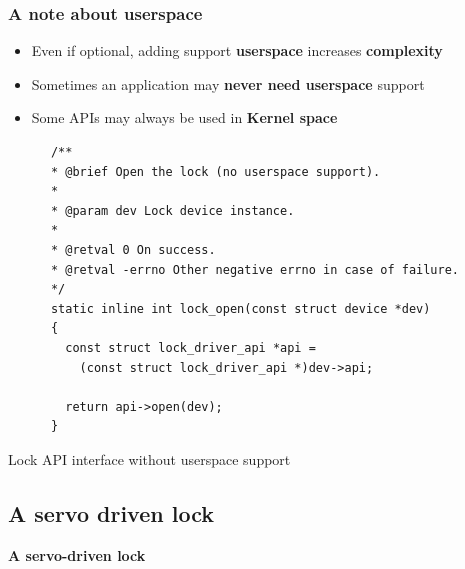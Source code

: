 \documentclass[handout]{beamer}
\begin{document}
\begin{frame}[fragile]
  \frametitle{A note about userspace}

  \begin{itemize}
    \item Even if optional, adding support \textbf{userspace} increases
          \textbf{complexity}
    \item Sometimes an application may \textbf{never need userspace} support
    \item Some APIs may always be used in \textbf{Kernel space}
  \end{itemize}

  \begin{listing}[H]
    \begin{verbatim}
      /**
      * @brief Open the lock (no userspace support).
      *
      * @param dev Lock device instance.
      *
      * @retval 0 On success.
      * @retval -errno Other negative errno in case of failure.
      */
      static inline int lock_open(const struct device *dev)
      {
        const struct lock_driver_api *api =
          (const struct lock_driver_api *)dev->api;

        return api->open(dev);
      }
    \end{verbatim}
    \caption{Lock API interface without userspace support}
  \end{listing}
\end{frame}

\subsection{A servo driven lock}

\begin{frame}
  \begin{center}
    \Large \textbf{A servo-driven lock}
  \end{center}
\end{frame}
\end{document}
